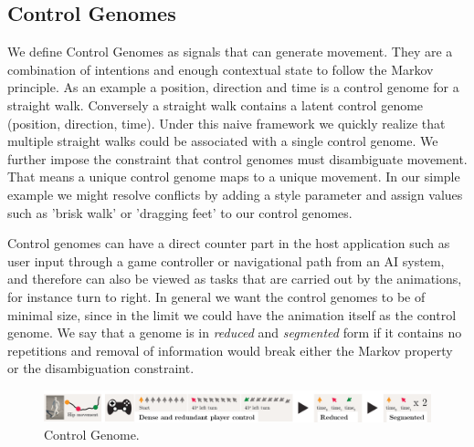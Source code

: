 \subsection{Control Genomes}
We define Control Genomes as signals that can generate movement. They are a combination of intentions and enough contextual state to follow the Markov principle. As an example a position, direction and time is a control genome for a straight walk. Conversely a straight walk contains a latent control genome (position, direction, time). Under this naive framework we quickly realize that multiple straight walks could be associated with a single control genome. We further impose the constraint that control genomes must disambiguate movement. That means a unique control genome maps to a unique movement. In our simple example we might resolve conflicts by adding a style parameter and assign values such as 'brisk walk' or 'dragging feet' to our control genomes. 

Control genomes can have a direct counter part in the host application such as user input through a game controller or navigational path from an AI system, and therefore can also be viewed as tasks that are carried out by the animations, for instance turn to right. In general we want the control genomes to be of minimal size, since in the limit we could have the animation itself as the control genome. We say that a genome is in \textit{reduced} and \textit{segmented} form if it contains no repetitions and removal of information would break either the Markov property or the disambiguation constraint. 

\begin{figure}
    \centering
    \includegraphics[width=1\columnwidth]{img/controlgenome.png}
    \caption{Control Genome.}
    \label{fig:control:genome}
\end{figure}

